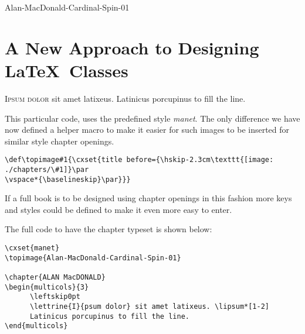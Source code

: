 \@specialfalse
{}
\def\topimage#1{#1}
\topimage{Alan-MacDonald-Cardinal-Spin-01}

\chapter{A New Approach to Designing \LaTeX\ Classes}
\begin{multicols}{3}
      \lettrine{I}{psum dolor} sit amet latixeus. \lipsum*[1-2]
      Latinicus porcupinus to fill the line.
\end{multicols}
\clearpage



This particular code, uses the predefined style \textit{manet}. The only difference we have now defined a helper macro to make it easier for such images to be inserted for similar style chapter openings.

\medskip

\begin{lstlisting}
\def\topimage#1{\cxset{title before={\hskip-2.3cm\texttt{[image: ./chapters/\#1]}\par
\vspace*{\baselineskip}\par}}}
\end{lstlisting}

If a full book is to be designed using chapter openings in this fashion more keys and styles could be defined to make it even more easy to enter.

The full code to have the chapter typeset is shown below:
\medskip

\begin{lstlisting}
\cxset{manet}
\topimage{Alan-MacDonald-Cardinal-Spin-01}

\chapter{ALAN MacDONALD}
\begin{multicols}{3}
      \leftskip0pt
      \lettrine{I}{psum dolor} sit amet latixeus. \lipsum*[1-2]
      Latinicus porcupinus to fill the line.
\end{multicols}
\end{lstlisting}
\lipsum[2]





